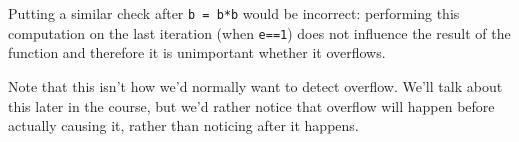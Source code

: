 \begin{flex}
\begin{solution}
\par\medskip\noindent\usebox{\lstboxA}\par
Putting a similar check after \lstinline'b = b*b' would be incorrect:
performing this computation on the last iteration (when
\lstinline'e==1') does not influence the result of the function and
therefore it is unimportant whether it overflows.

Note that this isn't how we'd normally want to detect overflow.
We'll talk about this later in the course, but we'd rather
notice that overflow will happen before actually causing it,
rather than noticing after it happens.
\end{solution}
\end{flex}


\printsolutions
% 
% 

